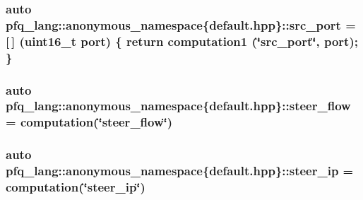 \hypertarget{namespacepfq__lang_1_1anonymous__namespace_02default_8hpp_03_ad4d03d1e69ba9608a2d87ac91a2b521f}{
\subsubsection[{src\-\_\-port}]{\setlength{\rightskip}{0pt plus 5cm}auto pfq\-\_\-lang\-::anonymous\-\_\-namespace\{default.\-hpp\}\-::src\-\_\-port = \mbox{[}$\,$\mbox{]} (uint16\-\_\-t {\bf port}) \{ return {\bf computation1} (\char`\"{}src\-\_\-port\char`\"{}, port); \}}}\label{namespacepfq__lang_1_1anonymous__namespace_02default_8hpp_03_ad4d03d1e69ba9608a2d87ac91a2b521f}
\hypertarget{namespacepfq__lang_1_1anonymous__namespace_02default_8hpp_03_aee7b4eb8c316f9c0cd6ee7bc22b517ef}{
\subsubsection[{steer\-\_\-flow}]{\setlength{\rightskip}{0pt plus 5cm}auto pfq\-\_\-lang\-::anonymous\-\_\-namespace\{default.\-hpp\}\-::steer\-\_\-flow = {\bf computation}(\char`\"{}steer\-\_\-flow\char`\"{})}}\label{namespacepfq__lang_1_1anonymous__namespace_02default_8hpp_03_aee7b4eb8c316f9c0cd6ee7bc22b517ef}
\hypertarget{namespacepfq__lang_1_1anonymous__namespace_02default_8hpp_03_ab44cbea49db522460c5bce82d04280cd}{
\subsubsection[{steer\-\_\-ip}]{\setlength{\rightskip}{0pt plus 5cm}auto pfq\-\_\-lang\-::anonymous\-\_\-namespace\{default.\-hpp\}\-::steer\-\_\-ip = {\bf computation}(\char`\"{}steer\-\_\-ip\char`\"{})}}\label{namespacepfq__lang_1_1anonymous__namespace_02default_8hpp_03_ab44cbea49db522460c5bce82d04280cd}
